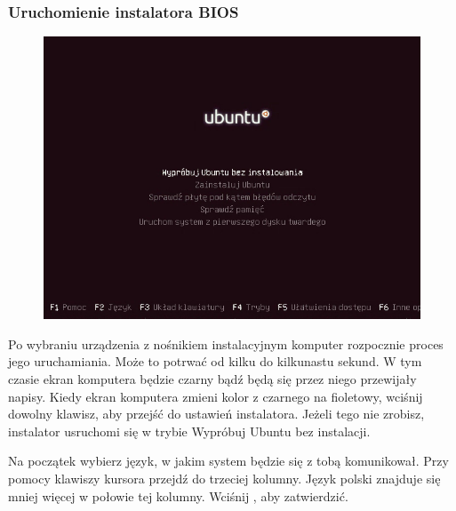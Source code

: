 \subsubsection{Uruchomienie instalatora BIOS}
\label{instalacja_uruchomienie}
\begin{figure}
	\vspace{-10pt}
	\includegraphics[width=\linewidth]{images/instalacja_BIOS_boot.png}
\end{figure}

Po wybraniu urządzenia z nośnikiem instalacyjnym komputer rozpocznie proces jego uruchamiania. Może to potrwać od kilku do kilkunastu sekund. W tym czasie ekran komputera będzie czarny bądź będą się przez niego przewijały napisy. Kiedy ekran komputera zmieni kolor z czarnego na fioletowy, wciśnij dowolny klawisz, aby przejść do ustawień instalatora. Jeżeli tego nie zrobisz, instalator usruchomi się w trybie \textcolor{ubuntu_orange}{Wypróbuj Ubuntu bez instalacji}.

Na początek wybierz język, w jakim system będzie się z tobą komunikował. Przy pomocy klawiszy kursora przejdź do trzeciej kolumny. Język polski znajduje się mniej więcej w połowie tej kolumny. Wciśnij \keys{\returnwin}, aby zatwierdzić.

